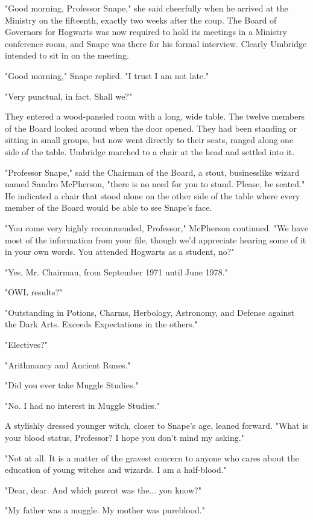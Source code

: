 "Good morning, Professor Snape," she said cheerfully when he arrived at the Ministry on the fifteenth, exactly two weeks after the coup. The Board of Governors for Hogwarts was now required to hold its meetings in a Ministry conference room, and Snape was there for his formal interview. Clearly Umbridge intended to sit in on the meeting.

"Good morning," Snape replied. "I trust I am not late."

"Very punctual, in fact. Shall we?"

They entered a wood-paneled room with a long, wide table. The twelve members of the Board looked around when the door opened. They had been standing or sitting in small groups, but now went directly to their seats, ranged along one side of the table. Umbridge marched to a chair at the head and settled into it.

"Professor Snape," said the Chairman of the Board, a stout, businesslike wizard named Sandro McPherson, "there is no need for you to stand. Please, be seated." He indicated a chair that stood alone on the other side of the table where every member of the Board would be able to see Snape's face.

"You come very highly recommended, Professor," McPherson continued. "We have most of the information from your file, though we'd appreciate hearing some of it in your own words. You attended Hogwarts as a student, no?"

"Yes, Mr. Chairman, from September 1971 until June 1978."

"OWL results?"

"Outstanding in Potions, Charms, Herbology, Astronomy, and Defense against the Dark Arts. Exceeds Expectations in the others."

"Electives?"

"Arithmancy and Ancient Runes."

"Did you ever take Muggle Studies."

"No. I had no interest in Muggle Studies."

A stylishly dressed younger witch, closer to Snape's age, leaned forward. "What is your blood status, Professor? I hope you don't mind my asking."

"Not at all. It is a matter of the gravest concern to anyone who cares about the education of young witches and wizards. I am a half-blood."

"Dear, dear. And which parent was the... you know?"

"My father was a muggle. My mother was pureblood."

